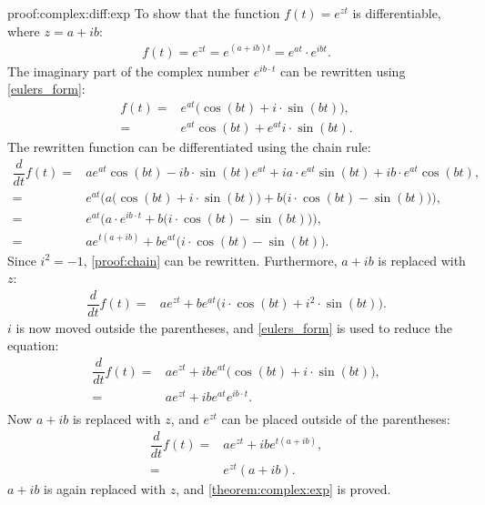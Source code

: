 \begin{prof}{}{proof:complex:diff:exp}
To show that the function $f(t)=e^{z t}$ is differentiable, where $z=a+ ib$:
\begin{align*}
	f(t) = e^{zt}= e^{(a+ib)t}= e^{at} \cdot e^{ib t}.
\end{align*}
The imaginary part of the complex number $e^{ib\cdot t}$ can be rewritten using \cref{eulers_form}:
\begin{align*}
	f(t) =& e^{at}\big(\cos(bt)+i \cdot \sin(bt)\big), \\
		 =& e^{at}\cos(bt) + e^{at} i \cdot \sin(bt).
\end{align*}
The rewritten function can be differentiated using the chain rule:
\begin{align}
	\dfrac{d}{dt}f(t) =& ae^{at}\cos(bt) -ib \cdot \sin(bt)e^{at} + ia \cdot e^{at}\sin(bt) + ib \cdot e^{at}\cos(bt), \nonumber \\
	=& e^{at} \bigg( a\big(\cos(bt) + i \cdot \sin(bt)\big) + b\big(i \cdot \cos(bt) - \sin(bt)\big) \bigg), \nonumber \\
	=& e^{at}\bigg(a \cdot e^{ib \cdot t}+b\big(i \cdot \cos(bt) - \sin(bt)\big)\bigg), \nonumber \\
	=& a e^{t(a+ib)} + b e^{at}\big(i \cdot \cos(bt) - \sin(bt)\big). \label{proof:chain}
\end{align}
Since $i^2 = -1$, \eqref{proof:chain} can be rewritten. Furthermore, $a+ib$ is replaced with $z$:
\begin{align*}
	\dfrac{d}{dt}f(t) =& a e^{zt} + b e^{at}\big(i \cdot \cos(bt) + i^2 \cdot \sin(bt)\big).
\end{align*}
$i$ is now moved outside the parentheses, and \cref{eulers_form} is used to reduce the equation:
\begin{align*}
	\dfrac{d}{dt}f(t) =&  a e^{zt} + ib e^{at}\big(\cos(bt) + i \cdot \sin(bt)\big), \\
	=&  a e^{zt} + ib e^{at}e^{ib \cdot t}. \\
\end{align*}
Now $a+ib$ is replaced with $z$, and $e^{zt}$ can be placed outside of the parentheses:
\begin{align*}
	\dfrac{d}{dt}f(t) =&  a e^{zt} + ib e^{t(a+ib)}, \\
	=&  e^{zt}(a+ib).
\end{align*}
$a+ib$ is again replaced with $z$, and \cref{theorem:complex:exp} is proved.
\end{prof}
